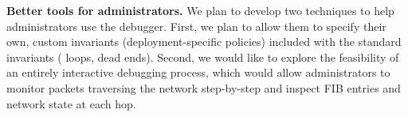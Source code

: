 {\bf Better tools for administrators.} We plan to develop two techniques to help administrators use
the debugger. First, we plan to allow them to specify their own, custom invariants (deployment-specific policies)
 included with the standard invariants (\eg{} loops, dead ends).
Second, we would like to explore the feasibility of an entirely interactive
debugging process, which would allow administrators to monitor
packets traversing the network step-by-step and inspect FIB entries and network state at each hop.

